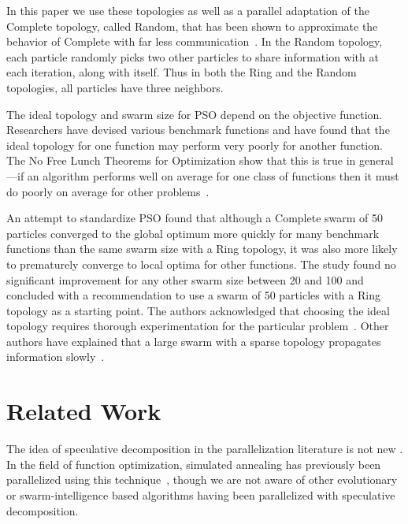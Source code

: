 \documentclass[smallcondensed]{svjour3}
\begin{document}
In this paper we use these topologies as well as a parallel adaptation of the
Complete topology, called Random, that has been shown to approximate the
behavior of Complete with far less
communication~\citep{mcnabb-2009-large-particle-swarms}.  In the Random
topology, each particle randomly picks two other particles to share information
with at each iteration, along with itself.  Thus in both the Ring and the
Random topologies, all particles have three neighbors.

The ideal topology and swarm size for PSO depend on the objective function.
Researchers have devised various benchmark functions and have found that the
ideal topology for one function may perform very poorly for another function.
The No Free Lunch Theorems for Optimization show that this is true in
general---if an algorithm performs well on average for one class of functions
then it must do poorly on average for other
problems~\citep{wolpert-1997-nfl-for-optimization}.

An attempt to standardize PSO found that although a Complete swarm of 50
particles converged to the global optimum more quickly for many benchmark
functions than the same swarm size with a Ring topology, it was also more
likely to prematurely converge to local optima for other functions.  The study
found no significant improvement for any other swarm size between 20 and 100
and concluded with a recommendation to use a swarm of 50 particles with a Ring
topology as a starting point.  The authors acknowledged that choosing the ideal
topology requires thorough experimentation for the particular
problem~\citep{bratton-2007-defining-a-standard-for-pso}.  Other authors have
explained that a large swarm with a sparse topology propagates information
slowly~\citep{montes-de-oca-2009-frankensteins-pso}.

\section{Related Work}
\label{sec:related}

The idea of speculative decomposition in the parallelization literature is not
new \citep{grama-2003-intro-to-parallel-computing}.  In the field of function
optimization, simulated annealing has previously been parallelized using this
technique~\citep{witte-1991-parallel-simulated-annealing-speculative}, though
we are not aware of other evolutionary or swarm-intelligence based algorithms
having been parallelized with speculative decomposition.
\end{document}
